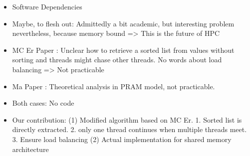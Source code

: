 \begin{invisible}
  \begin{itemize}
  \item Software Dependencies
  \item Maybe, to flesh out: Admittedly a bit academic, but interesting problem nevertheless, because memory bound => This is the future of HPC
  \end{itemize}
\end{invisible}


\begin{invisible}
  \begin{itemize}
  \item MC Er Paper \cite{er1983parallel}: Unclear how to retrieve a sorted list from values without sorting and threads might chase other threads. No words about load balancing => Not practicable
  \item Ma Paper \cite{ma1997efficient}: Theoretical analysis in PRAM model, not practicable.
  \item Both cases: No code
  \item Our contribution: (1) Modified algorithm based on MC Er. 1. Sorted list is directly extracted. 2. only one thread continues when multiple threads meet. 3. Ensure load balancing
                          (2) Actual implementation for shared memory architecture
  \end{itemize}
\end{invisible}

